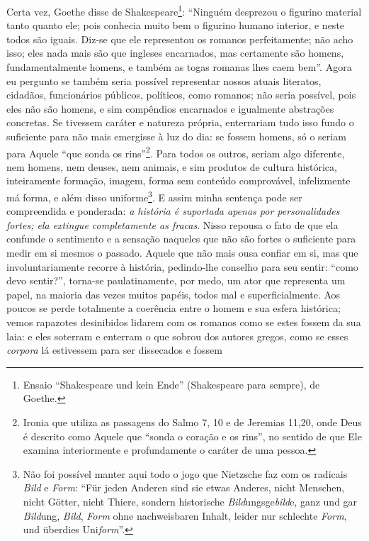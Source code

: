 Certa vez, Goethe disse de Shakespeare\footnote{Ensaio ``Shakespeare und
  kein Ende'' (Shakespeare para sempre), de Goethe.}: ``Ninguém
desprezou o figurino material tanto quanto ele; pois conhecia muito bem
o figurino humano interior, e neste todos são iguais. Diz-se que ele
representou os romanos perfeitamente; não acho isso; eles nada mais são
que ingleses encarnados, mas certamente são homens, fundamentalmente
homens, e também as togas romanas lhes caem bem''. Agora eu pergunto se
também seria possível representar nossos atuais literatos, cidadãos,
funcionários públicos, políticos, como romanos; não seria possível, pois
eles não são homens, e sim compêndios encarnados e igualmente abstrações
concretas. Se tivessem caráter e natureza própria, enterrariam tudo isso
fundo o suficiente para não mais emergisse à luz do dia: se fossem
homens, só o seriam para Aquele ``que sonda os rins''\footnote{Ironia
  que utiliza as passagens do Salmo 7, 10 e de Jeremias 11,20, onde Deus
  é descrito como Aquele que ``sonda o coração e os rins'', no sentido
  de que Ele examina interiormente e profundamente o caráter de uma
  pessoa.}. Para todos os outros, seriam algo diferente, nem homens, nem
deuses, nem animais, e sim produtos de cultura histórica, inteiramente
formação, imagem, forma sem conteúdo comprovável, infelizmente má forma,
e além disso uniforme\footnote{Não foi possível manter aqui todo o jogo
  que Nietzsche faz com os radicais \emph{Bild} e \emph{Form}: ``Für
  jeden Anderen sind sie etwas Anderes, nicht Menschen, nicht Götter,
  nicht Thiere, sondern historische \emph{Bild}ungsge\emph{bild}e, ganz
  und gar \emph{Bild}ung, \emph{Bild}, \emph{Form} ohne nachweisbaren
  Inhalt, leider nur schlechte \emph{Form}, und überdies
  Uni\emph{form}''.}. E assim minha sentença pode ser compreendida e
ponderada: \emph{a história é suportada apenas por personalidades
fortes; ela extingue completamente as fracas}. Nisso repousa o fato de
que ela confunde o sentimento e a sensação naqueles que não são fortes o
suficiente para medir em si mesmos o passado. Aquele que não mais ousa
confiar em si, mas que involuntariamente recorre à história, pedindo-lhe
conselho para seu sentir: ``como devo sentir?'', torna-se
paulatinamente, por medo, um ator que representa um papel, na maioria
das vezes muitos papéis, todos mal e superficialmente. Aos poucos se
perde totalmente a coerência entre o homem e sua esfera histórica; vemos
rapazotes desinibidos lidarem com os romanos como se estes fossem da sua
laia: e eles soterram e enterram o que sobrou dos autores gregos, como
se esses \emph{corpora} lá estivessem para ser dissecados e fossem
